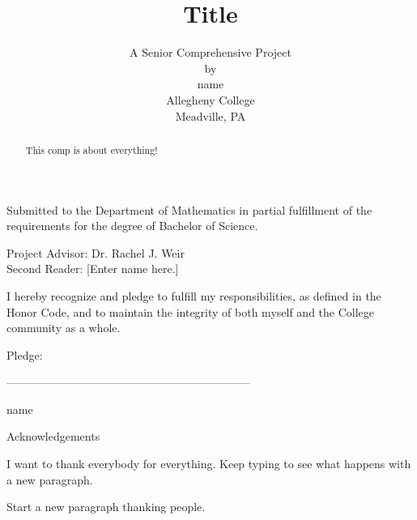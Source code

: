 \documentclass[11pt]{article}
\title{\bf{Title}}
\theoremstyle{plain}
\theoremstyle{definition}
\begin{document}
\author {A Senior Comprehensive Project \\
by\\
name \\
Allegheny College\\
Meadville, PA}

\maketitle
\thispagestyle{empty}
\begin{center}
Submitted to the Department of Mathematics in partial fulfillment of the requirements for the degree of Bachelor of Science.
\end{center}

\vspace{0.5 in}
\begin{center}
Project Advisor:  Dr. Rachel J. Weir \\
Second Reader: [Enter name here.]
\end{center}

\vspace{0.5 in}
\begin{center}
I hereby recognize and pledge to fulfill my responsibilities, as defined in the Honor Code, and to maintain the integrity of both myself and the College community as a whole.
\end{center}

\vspace{0.25 in}
\begin{center}
Pledge:

\vspace{0.5 in}
-----------------------------------------------------------------

\vspace{0.00 in}
name
\end{center}

\newpage
\thispagestyle{empty}
\begin{center}
Acknowledgements
\end{center}
\doublespacing
I want to thank everybody for everything.  Keep typing to see what happens with a new paragraph.

Start a new paragraph thanking people.

\newpage

\thispagestyle{empty}

\begin{abstract}
This comp is about everything!
\end{abstract}
\newpage
\thispagestyle{empty}
\tableofcontents
\end{document}
